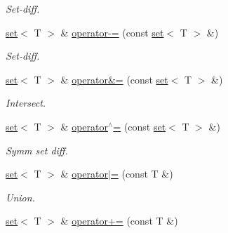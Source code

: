 \begin{DoxyCompactItemize}
\begin{DoxyCompactList}\small\item\em Set-\/diff. \end{DoxyCompactList}\item 
\hyperlink{classmerlin_1_1set}{set}$<$ T $>$ \& \hyperlink{classmerlin_1_1set_a8e5f0d149fec50878e7cc767e683f304}{operator-\/=} (const \hyperlink{classmerlin_1_1set}{set}$<$ T $>$ \&)\hypertarget{classmerlin_1_1set_a8e5f0d149fec50878e7cc767e683f304}{}\label{classmerlin_1_1set_a8e5f0d149fec50878e7cc767e683f304}

\begin{DoxyCompactList}\small\item\em Set-\/diff. \end{DoxyCompactList}\item 
\hyperlink{classmerlin_1_1set}{set}$<$ T $>$ \& \hyperlink{classmerlin_1_1set_a4428ef791cee89dd567785aba416e2e8}{operator\&=} (const \hyperlink{classmerlin_1_1set}{set}$<$ T $>$ \&)\hypertarget{classmerlin_1_1set_a4428ef791cee89dd567785aba416e2e8}{}\label{classmerlin_1_1set_a4428ef791cee89dd567785aba416e2e8}

\begin{DoxyCompactList}\small\item\em Intersect. \end{DoxyCompactList}\item 
\hyperlink{classmerlin_1_1set}{set}$<$ T $>$ \& \hyperlink{classmerlin_1_1set_a18a65ff994f1a9c6bbf2fbca253a2ebf}{operator$^\wedge$=} (const \hyperlink{classmerlin_1_1set}{set}$<$ T $>$ \&)\hypertarget{classmerlin_1_1set_a18a65ff994f1a9c6bbf2fbca253a2ebf}{}\label{classmerlin_1_1set_a18a65ff994f1a9c6bbf2fbca253a2ebf}

\begin{DoxyCompactList}\small\item\em Symm set diff. \end{DoxyCompactList}\item 
\hyperlink{classmerlin_1_1set}{set}$<$ T $>$ \& \hyperlink{classmerlin_1_1set_a40a231741cd7852f3cdf4f8a0e49f691}{operator$\vert$=} (const T \&)\hypertarget{classmerlin_1_1set_a40a231741cd7852f3cdf4f8a0e49f691}{}\label{classmerlin_1_1set_a40a231741cd7852f3cdf4f8a0e49f691}

\begin{DoxyCompactList}\small\item\em Union. \end{DoxyCompactList}\item 
\hyperlink{classmerlin_1_1set}{set}$<$ T $>$ \& \hyperlink{classmerlin_1_1set_a97a67ab3addec83ef5ddff361ba29b7e}{operator+=} (const T \&)\hypertarget{classmerlin_1_1set_a97a67ab3addec83ef5ddff361ba29b7e}{}\label{classmerlin_1_1set_a97a67ab3addec83ef5ddff361ba29b7e}


\end{DoxyCompactItemize}
